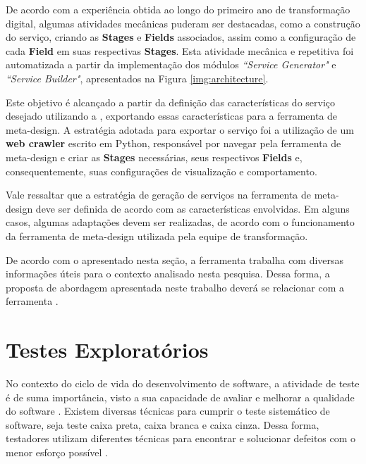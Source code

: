 De acordo com a experiência obtida ao longo do primeiro ano de transformação digital, algumas atividades mecânicas puderam ser destacadas, como a construção do serviço, criando as \textbf{Stages} e \textbf{Fields} associados, assim como a configuração de cada \textbf{Field} em suas respectivas \textbf{Stages}. Esta atividade mecânica e repetitiva foi automatizada a partir da implementação dos módulos \textit{``Service Generator"} e \textit{``Service Builder"}, apresentados na Figura \ref{img:architecture}.

Este objetivo é alcançado a partir da definição das características do serviço desejado utilizando a \itractool, exportando essas características para a ferramenta de meta-design. A estratégia adotada para exportar o serviço foi a utilização de um \textbf{web crawler} escrito em Python, responsável por navegar pela ferramenta de meta-design e criar as \textbf{Stages} necessárias, seus respectivos \textbf{Fields} e, consequentemente, suas configurações de visualização e comportamento.

Vale ressaltar que a estratégia de geração de serviços na ferramenta de meta-design deve ser definida de acordo com as características envolvidas. Em alguns casos, algumas adaptações devem ser realizadas, de acordo com o funcionamento da ferramenta de meta-design utilizada pela equipe de transformação.


De acordo com o apresentado nesta seção, a ferramenta \itractool trabalha com diversas informações úteis para o contexto analisado nesta pesquisa. Dessa forma, a proposta de abordagem apresentada neste trabalho deverá se relacionar com a ferramenta \itractool.

\section{Testes Exploratórios}
\label{sec:testes_exploratorios}

 No contexto do ciclo de vida do desenvolvimento de software, a atividade de teste é de suma importância, visto a sua capacidade de avaliar e melhorar a qualidade do software \cite{bertolino2007software}. Existem diversas técnicas para cumprir o teste sistemático de software, seja teste caixa preta, caixa branca e caixa cinza. Dessa forma, testadores utilizam diferentes técnicas para encontrar e solucionar defeitos com o menor esforço possível \cite{maldonado2004introduccao}. 

